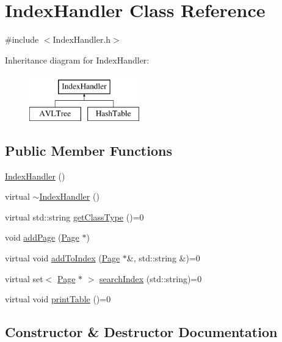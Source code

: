 \hypertarget{class_index_handler}{}\section{Index\+Handler Class Reference}
\label{class_index_handler}


{\ttfamily \#include $<$Index\+Handler.\+h$>$}

Inheritance diagram for Index\+Handler\+:\begin{figure}[H]
\begin{center}
\leavevmode
\includegraphics[height=2.000000cm]{class_index_handler}
\end{center}
\end{figure}
\subsection*{Public Member Functions}
\begin{DoxyCompactItemize}
\item 
\hyperlink{class_index_handler_a27748387661142a2eb545be6f0499996}{Index\+Handler} ()
\item 
virtual \hyperlink{class_index_handler_ad787ca8cf83345ecfe332d2c3b8f8009}{$\sim$\+Index\+Handler} ()
\item 
virtual std\+::string \hyperlink{class_index_handler_aaeb0f250516fbc93936efec2c3f21359}{get\+Class\+Type} ()=0
\item 
void \hyperlink{class_index_handler_aa916a3613990ed790d281863d685cfc5}{add\+Page} (\hyperlink{class_page}{Page} $\ast$)
\item 
virtual void \hyperlink{class_index_handler_a102638a9813e71541092a6695bd24012}{add\+To\+Index} (\hyperlink{class_page}{Page} $\ast$\&, std\+::string \&)=0
\item 
virtual set$<$ \hyperlink{class_page}{Page} $\ast$ $>$ \hyperlink{class_index_handler_ac3213de7636a1332440c3204957f4658}{search\+Index} (std\+::string)=0
\item 
virtual void \hyperlink{class_index_handler_a036ccca02cb734711a1e6a50b09a2b1f}{print\+Table} ()=0
\end{DoxyCompactItemize}


\subsection{Constructor \& Destructor Documentation}
\hypertarget{class_index_handler_a27748387661142a2eb545be6f0499996}{}
